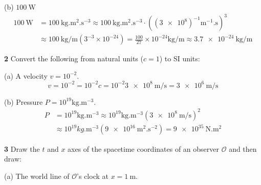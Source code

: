 \documentclass[gr-notes.tex]{subfiles}
\begin{document}
(b) $\SI{100}{\watt}$
\begin{align*}
  \SI{100}{\watt} &=
  \SI{100}{\kilogram.\meter^2.\second^{-3}} \approx
  \SI{100}{\kilogram.\meter^2.\second^{-3}} \cdot
  ((\num{3e8})^{-1} \si{\meter^{-1}.\second})^3
  \\ &\approx
  \SI{100}{\kilogram\per\meter} (3^{-3} \times 10^{-24}) =
  \frac{100}{27} \times 10^{-24} \si{\kilogram\per\meter} \approx
  \SI{3.7e-24}{\kilogram\per\meter}
\end{align*}


\textbf{2}
Convert the following from natural units ($c = 1$) to SI units:

(a) A velocity $v = 10^{-2}$.
\begin{displaymath}
  v = 10^{-2} =
  10^{-2} c =
  10^{-2} \SI{3e8}{\meter\per\second} =
  \SI{3e6}{\meter\per\second}
\end{displaymath}

(b) Pressure $P = 10^{19} \si{\kilogram.\meter^{-3}}$.
\begin{align*}
  P &=
  10^{19} \si{\kilogram.\meter^{-3}} \approx
  10^{19} \si{\kilogram.\meter^{-3}} (\SI{3e8}{\meter\per\second})^2
  \\ &\approx
  10^{19} \si{kg.\meter^{-3}} (\SI{9e16}{\meter^2.\second^{-2}}) =
  \SI{9e35}{\newton.\meter^2}
\end{align*}


\textbf{3}
Draw the $t$ and $x$ axes of the spacetime coordinates of an observer $\mathcal{O}$ and then draw:

(a) The world line of $\mathcal{O}$'s clock at $x = \SI{1}{\meter}$.
\end{document}
